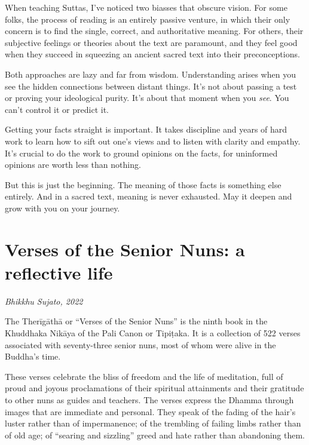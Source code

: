 \documentclass[12pt,openany]{book}%
\newcommand*{\scbyline}[1]{\begin{flushright}\textit{#1}\end{flushright}\bigskip}
\begin{document}
When teaching Suttas, I’ve noticed two biasses that obscure vision. For some folks, the process of reading is an entirely passive venture, in which their only concern is to find the single, correct, and authoritative meaning. For others, their subjective feelings or theories about the text are paramount, and they feel good when they succeed in squeezing an ancient sacred text into their preconceptions. 

Both approaches are lazy and far from wisdom. Understanding arises when you see the hidden connections between distant things. It’s not about passing a test or proving your ideological purity. It’s about that moment when you \emph{see}. You can’t control it or predict it. 

Getting your facts straight is important. It takes discipline and years of hard work to learn how to sift out one’s views and to listen with clarity and empathy. It’s crucial to do the work to ground opinions on the facts, for uninformed opinions are worth less than nothing. 

But this is just the beginning. The meaning of those facts is something else entirely. And in a sacred text, meaning is never exhausted. May it deepen and grow with you on your journey. 

%
\chapter*{Verses of the Senior Nuns: a reflective life}

\scbyline{Bhikkhu Sujato, 2022}

The \textsanskrit{Therīgāthā} or “Verses of the Senior Nuns” is the ninth book in the Khuddhaka \textsanskrit{Nikāya} of the Pali Canon or \textsanskrit{Tipiṭaka}. It is a collection of 522 verses associated with seventy-three senior nuns, most of whom were alive in the Buddha’s time.

These verses celebrate the bliss of freedom and the life of meditation, full of proud and joyous proclamations of their spiritual attainments and their gratitude to other nuns as guides and teachers. The verses express the Dhamma through images that are immediate and personal. They speak of the fading of the hair’s luster rather than of impermanence; of the trembling of failing limbs rather than of old age; of “searing and sizzling” greed and hate rather than abandoning them.
\end{document}
